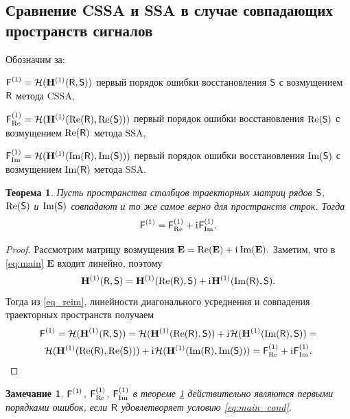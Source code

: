 \documentclass[specialist,
               substylefile = spbu.rtx,
               subf,href,colorlinks=true, 12pt]{disser}
\newtheorem{theorem}{Теорема}
\newtheorem{remark}{Замечание}
\begin{document}
\subsection{Сравнение CSSA и SSA в случае совпадающих пространств сигналов}

Обозначим за:

$\textsf{F}^{(1)} = \mathcal{H}(\mathbf{H}^{(1)}(\textsf{R}, \textsf{S}))$ первый порядок ошибки восстановления $\textsf{S}$ с возмущением $\textsf{R}$ метода CSSA,

$\textsf{F}^{(1)}_{\Re} = \mathcal{H}(\mathbf{H}^{(1)}(\Re(\textsf{R}), \Re(\textsf{S})))$ первый порядок ошибки восстановления $\Re(\textsf{S})$ с возмущением $\Re(\textsf{R})$ метода SSA,

$\textsf{F}^{(1)}_{\Im} = \mathcal{H}(\mathbf{H}^{(1)}(\Im(\textsf{R}), \Im(\textsf{S})))$ первый порядок ошибки восстановления $\Im(\textsf{S})$ с возмущением $\Im(\textsf{R})$ метода SSA.


\begin{theorem}\label{th:sum}
	Пусть пространства столбцов траекторных матриц рядов $\textsf{S}$, $\Re(\textsf{S})$ и $\Im(\textsf{S})$ совпадают и то же самое верно для пространств строк.
	Тогда $$\textsf{F}^{(1)} = \textsf{F}^{(1)}_{\Re} + \mathrm{i}\mkern1mu\textsf{F}^{(1)}_{\Im}.$$
\end{theorem}
\begin{proof}
	Рассмотрим матрицу возмущения $\mathbf{E} = \Re(\mathbf{E}) + \mathrm{i}\mkern1mu\Im(\mathbf{E}).$
	Заметим, что в \eqref{eq:main} $\mathbf{E}$ входит линейно, поэтому
	\begin{equation} \label{eq_reim}
		\mathbf{H}^{(1)}(\textsf{R}, \textsf{S}) = \mathbf{H}^{(1)}(\Re(\textsf{R}), \textsf{S}) + \mathrm{i}\mkern1mu\mathbf{H}^{(1)}(\Im(\textsf{R}), \textsf{S}).
	\end{equation}
	Тогда из \eqref{eq_reim}, линейности диагонального усреднения и  совпадения траекторных пространств получаем
	\begin{multline*}
		\textsf{F}^{(1)} = \mathcal{H}(\mathbf{H}^{(1)}(\textsf{R}, \textsf{S})) = \mathcal{H}(\mathbf{H}^{(1)}(\Re(\textsf{R}), \textsf{S})) + \mathrm{i}\mkern1mu\mathcal{H}(\mathbf{H}^{(1)}(\Im(\textsf{R}), \textsf{S})) =\\
		\mathcal{H}(\mathbf{H}^{(1)}(\Re(\textsf{R}), \Re(\textsf{S}))) + \mathrm{i}\mkern1mu\mathcal{H}(\mathbf{H}^{(1)}(\Im(\textsf{R}), \Im(\textsf{S}))) = \textsf{F}^{(1)}_{\Re} + \mathrm{i}\mkern1mu\textsf{F}^{(1)}_{\Im}.	
	\end{multline*}
	
\end{proof}

\begin{remark} \label{rm:th_R}
	$\textsf{F}^{(1)}$, $\textsf{F}^{(1)}_{\Re}$, $\textsf{F}^{(1)}_{\Im}$ в теореме \ref{th:sum} действительно являются первыми порядками ошибок, если $\textsf{R}$ удовлетворяет условию \eqref{eq:main_cond}.
\end{remark}
\end{document}
